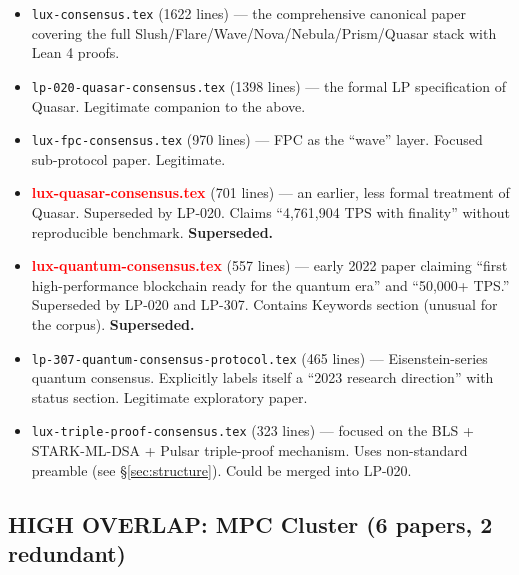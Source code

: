 \documentclass[11pt,a4paper]{article}
\newcommand{\verdict}[1]{\textcolor{red}{\textbf{#1}}}
\begin{document}
\begin{itemize}
\item \texttt{lux-consensus.tex} (1622 lines) --- the comprehensive canonical
      paper covering the full Slush/Flare/Wave/Nova/Nebula/Prism/Quasar stack
      with Lean 4 proofs.
\item \texttt{lp-020-quasar-consensus.tex} (1398 lines) --- the formal LP
      specification of Quasar. Legitimate companion to the above.
\item \texttt{lux-fpc-consensus.tex} (970 lines) --- FPC as the ``wave'' layer.
      Focused sub-protocol paper. Legitimate.
\item \verdict{lux-quasar-consensus.tex} (701 lines) --- an earlier, less
      formal treatment of Quasar. Superseded by LP-020. Claims ``4,761,904 TPS
      with finality'' without reproducible benchmark. \textbf{Superseded.}
\item \verdict{lux-quantum-consensus.tex} (557 lines) --- early 2022 paper
      claiming ``first high-performance blockchain ready for the quantum era''
      and ``50,000+ TPS.'' Superseded by LP-020 and LP-307. Contains Keywords
      section (unusual for the corpus). \textbf{Superseded.}
\item \texttt{lp-307-quantum-consensus-protocol.tex} (465 lines) ---
      Eisenstein-series quantum consensus. Explicitly labels itself a ``2023
      research direction'' with status section. Legitimate exploratory paper.
\item \texttt{lux-triple-proof-consensus.tex} (323 lines) --- focused on the
      BLS + STARK-ML-DSA + Pulsar triple-proof mechanism. Uses non-standard
      preamble (see \S\ref{sec:structure}). Could be merged into LP-020.
\end{itemize}

\subsection{HIGH OVERLAP: MPC Cluster (6 papers, 2 redundant)}
\end{document}
